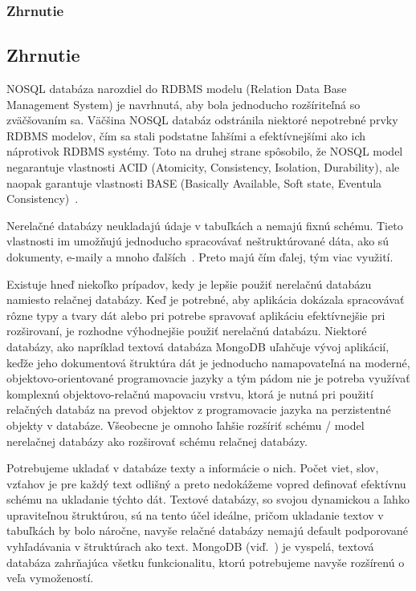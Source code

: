 %
%
{
	\subsubsection{Zhrnutie}
}
{
	\subsection{Zhrnutie}
}
NOSQL databáza narozdiel do RDBMS modelu (Relation Data Base Management System) je
navrhnutá, aby bola jednoducho rozšíriteľná so zväčšovaním sa. Väčšina NOSQL databáz odstránila niektoré nepotrebné prvky RDBMS modelov, čím sa stali podstatne ľahšími a efektívnejšími ako ich náprotivok RDBMS systémy. Toto na druhej strane spôsobilo, že NOSQL model negarantuje vlastnosti ACID (Atomicity, Consistency, Isolation, Durability), ale naopak garantuje vlastnosti BASE (Basically Available, Soft state, Eventula Consistency)~\cite{NoSQLDBvsRealtionDB}.

Nerelačné databázy neukladajú údaje v tabuľkách a nemajú fixnú schému. Tieto vlastnosti im umožňujú jednoducho spracovávať neštruktúrované dáta, ako sú dokumenty, e-maily a mnoho ďalších~\cite{MongoDBvsMySQL2015}. Preto majú čím ďalej, tým viac využití.

Existuje hneď niekoľko prípadov, kedy je lepšie použiť nerelačnú databázu namiesto relačnej databázy. Keď je potrebné, aby aplikácia dokázala spracovávať rôzne typy a tvary dát alebo pri potrebe spravovať aplikáciu efektívnejšie pri rozširovaní, je rozhodne výhodnejšie použiť nerelačnú databázu. Niektoré databázy, ako napríklad textová databáza MongoDB uľahčuje vývoj aplikácií, keďže jeho dokumentová štruktúra dát je jednoducho namapovateľná na moderné, objektovo-orientované programovacie jazyky a tým pádom nie je potreba využívať komplexnú objektovo-relačnú mapovaciu vrstvu, ktorá je nutná pri použití relačných databáz na prevod objektov z programovacie jazyka na perzistentné objekty v databáze. Všeobecne je omnoho ľahšie rozšíriť schému / model nerelačnej databázy ako rozširovať schému relačnej databázy.

Potrebujeme ukladať v databáze texty a informácie o nich. Počet viet, slov, vzťahov je pre každý text odlišný a preto nedokážeme vopred definovať efektívnu schému na ukladanie týchto dát. Textové databázy, so svojou dynamickou a ľahko upraviteľnou štruktúrou, sú na tento účel ideálne, pričom ukladanie textov v tabuľkách by bolo náročne, navyše relačné databázy nemajú default podporované vyhľadávania v štruktúrach ako text. MongoDB (viď.~) je vyspelá, textová databáza zahrňajúca všetku funkcionalitu, ktorú potrebujeme navyše rozšírenú o veľa vymožeností.


